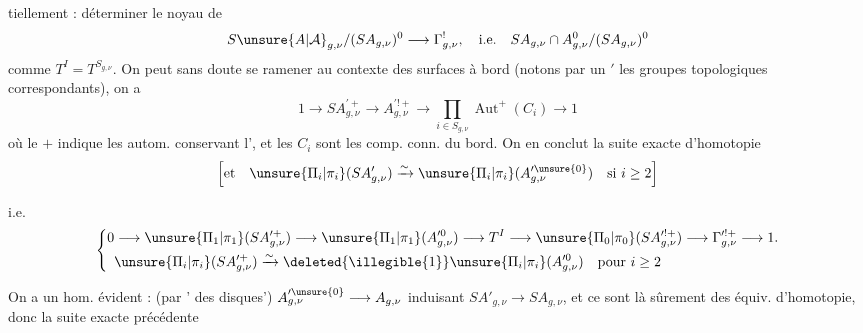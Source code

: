 tiellement : déterminer le noyau de
\[
S\unsure{A|\mathcal A}_{g,\nu}/(SA_{g,\nu})^0\longrightarrow\Gamma^!_{g,\nu},
\quad\text{i.e.}\quad
SA_{g,\nu}\cap A_{g,\nu}^0/(SA_{g,\nu})^0
\]
comme $T^I=T^{S_{g,\nu}}$. On peut sans doute se ramener au contexte des surfaces  à bord (notons par un $'$ les groupes topologiques correspondants), on a
\[
1\longrightarrow SA_{g,\nu}^{\prime+}\longrightarrow
A_{g,\nu}^{\prime!+}\longrightarrow
\prod_{i\in S_{g,\nu}}\operatorname{Aut}^+(C_i)\longrightarrow1
\]
où le $+$ indique les autom. conservant l', et les $C_i$ sont les comp. conn. du bord. On en conclut la suite exacte d'homotopie
\[
\left[\text{et}\quad
\unsure{\Pi_i|\pi_i}(SA'_{g,\nu})\xrightarrow{\sim}
\unsure{\Pi_i|\pi_i}(A_{g,\nu}^{\prime\unsure{0}})
\quad\text{si }i\geq2\right]
\]

i.e.
\[
\left\{\begin{aligned}
0&\longrightarrow\unsure{\Pi_1|\pi_1}(SA_{g,\nu}^{\prime+})
\longrightarrow\unsure{\Pi_1|\pi_1}(A_{g,\nu}^{\prime0})
\longrightarrow T^I\longrightarrow\unsure{\Pi_0|\pi_0}(SA_{g,\nu}^{\prime!+})
\longrightarrow\Gamma_{g,\nu}^{\prime!+}\longrightarrow1.\\
&\unsure{\Pi_i|\pi_i}(SA_{g,\nu}^{\prime+})\xrightarrow{\sim}
\deleted{\illegible{1}}\unsure{\Pi_i|\pi_i}(A_{g,\nu}^{\prime0})
\quad\text{pour }i\geq2
\end{aligned}\right.
\]

On a un hom. évident : (par ' des disques')
$A_{g,\nu}^{\prime\unsure{0}}\longrightarrow A_{g,\nu}$ induisant
$SA'_{g,\nu}\longrightarrow SA_{g,\nu}$,
 et ce sont là sûrement des équiv. d'homotopie, donc
 la suite exacte précédente

